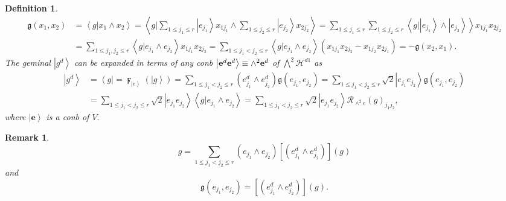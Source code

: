 \documentclass[aps,preprint]{revtex4}%
\newtheorem{definition}[theorem]{Definition}
\newtheorem{remark}[theorem]{Remark}
\begin{document}
\begin{definition}%
\begin{align}
\mathfrak{g}\left(  x_{1},x_{2}\right)   &  =\left\langle \left.  g\right\vert
x_{1}\wedge x_{2}\right\rangle =\left\langle \left.  \overset{\overset{}{}%
}{g}\right\vert \sum_{1\leq j_{1}\leq r}\left\vert e_{j_{1}}\right\rangle
x_{1j_{1}}\wedge\sum_{1\leq j_{2}\leq r}\left\vert e_{j_{2}}\right\rangle
x_{2j_{2}}\right\rangle =\sum_{1\leq j_{1}\leq r}\sum_{1\leq j_{2}\leq
r}\left\langle \left.  \overset{\overset{}{}}{g}\right\vert \left\vert
e_{j_{1}}\right\rangle \wedge\left\vert e_{j_{2}}\right\rangle \right\rangle
x_{1j_{1}}x_{2j_{2}}\\
&  =\sum_{1\leq j_{1},j_{2}\leq r}\left\langle \left.  \overset{\overset{}{}%
}{g}\right\vert e_{j_{1}}\wedge e_{j_{2}}\right\rangle x_{1j_{1}}x_{2j_{2}%
}=\sum_{1\leq j_{1}<j_{2}\leq r}\left\langle \left.  \overset{\overset{}{}%
}{g}\right\vert e_{j_{1}}\wedge e_{j_{2}}\right\rangle \left(  x_{1j_{1}%
}x_{2j_{2}}-x_{1j_{2}}x_{2j_{1}}\right)  =-\mathfrak{g}\left(  x_{2}%
,x_{1}\right)  .
\end{align}
The geminal $\left\vert g^{d}\right\rangle $ can be expanded in terms of any
conb $\left\vert \mathbf{e}^{d}\mathbf{e}^{d}\right\rangle \equiv
{\Large \wedge}^{2}\mathbf{e}^{d}$ of $\bigwedge\nolimits^{2}\mathcal{H}^{d1}$
as
\begin{align}
\left\vert g^{d}\right\rangle  &  =\left\langle g\right\vert =\digamma
_{\left\vert e\right\rangle }\left(  \left\vert g\right\rangle \right)
=\sum_{1\leq j_{1}<j_{2}\leq r}\left(  e_{j_{1}}^{d}\wedge e_{j_{2}}%
^{d}\right)  \mathfrak{g}\left(  e_{j_{1}},e_{j_{2}}\right)  =\sum_{1\leq
j_{1}<j_{2}\leq r}\sqrt{2}\left\vert e_{j_{1}}e_{j_{2}}\right\rangle
\mathfrak{g}\left(  e_{j_{1}},e_{j_{2}}\right) \\
&  =\sum_{1\leq j_{1}<j_{2}\leq r}\sqrt{2}\left\vert e_{j_{1}}e_{j_{2}%
}\right\rangle \left\langle \left.  \overset{\overset{}{}}{g}\right\vert
e_{j_{1}}\wedge e_{j_{2}}\right\rangle =\sum_{1\leq j_{1}<j_{2}\leq r}\sqrt
{2}\left\vert e_{j_{1}}e_{j_{2}}\right\rangle \mathcal{R}_{\wedge^{2}e}\left(
g\right)  _{j_{1}j_{2}},
\end{align}
where $\left\vert \mathbf{e}\right\rangle $ is a conb of $V.$
\end{definition}

\begin{remark}%
\begin{equation}
g=\sum_{1\leq j_{1}<j_{2}\leq r}\left(  e_{j_{1}}\wedge e_{j_{2}}\right)
\left[  \left(  e_{j_{1}}^{d}\wedge e_{j_{2}}^{d}\right)  \right]  \left(
g\right)
\end{equation}
and
\begin{equation}
\mathfrak{g}\left(  e_{j_{1}},e_{j_{2}}\right)  =\left[  \left(  e_{j_{1}}%
^{d}\wedge e_{j_{2}}^{d}\right)  \right]  \left(  g\right)  .
\end{equation}

\end{remark}
\end{document}
